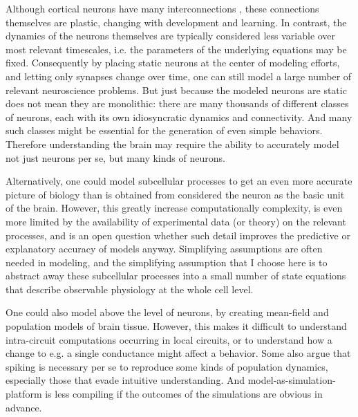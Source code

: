 Although cortical neurons have many interconnections \cite{ball2014rich}, these connections themselves are plastic, changing with development and learning.
In contrast, the dynamics of the neurons themselves are typically considered less variable over most relevant timescales, i.e. the parameters of the underlying equations may be fixed.
Consequently by placing static neurons at the center of modeling efforts, and letting only synapses change over time, one can still model a large number of relevant neuroscience problems.
But just because the modeled neurons are static does not mean they are monolithic: there are many thousands of different classes of neurons, each with its own idiosyncratic dynamics and connectivity.
And many such classes might be essential for the generation of even simple behaviors.
Therefore understanding the brain may require the ability to accurately model not just neurons per se, but many kinds of neurons.

Alternatively, one could model subcellular processes to get an even more accurate picture of biology than is obtained from considered the neuron as the basic unit of the brain.
However, this greatly increase computationally complexity, is even more limited by the availability of experimental data (or theory) on the relevant processes, and is an open question whether such detail improves the predictive or explanatory accuracy of models anyway.
Simplifying assumptions are often needed in modeling, and the simplifying assumption that I choose here is to abstract away these subcellular processes into a small number of state equations that describe observable physiology at the whole cell level.

One could also model above the level of neurons, by creating mean-field and population models of brain tissue.
However, this makes it difficult to understand intra-circuit computations occurring in local circuits, or to understand how a change to e.g. a single conductance might affect a behavior.
Some also argue that spiking is necessary per se to reproduce some kinds of population dynamics, especially those that evade intuitive understanding.
And model-as-simulation-platform is less compiling if the outcomes of the simulations are obvious in advance.

